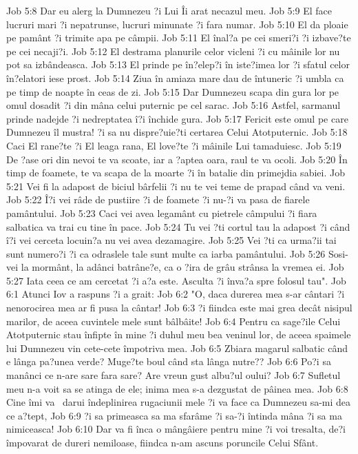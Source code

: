 Job 5:8  Dar eu alerg la Dumnezeu ?i Lui Îi arat necazul meu.
Job 5:9  El face lucruri mari ?i nepatrunse, lucruri minunate ?i fara numar.
Job 5:10  El da ploaie pe pamânt ?i trimite apa pe câmpii.
Job 5:11  El înal?a pe cei smeri?i ?i izbave?te pe cei necaji?i.
Job 5:12  El destrama planurile celor vicleni ?i cu mâinile lor nu pot sa izbândeasca.
Job 5:13  El prinde pe în?elep?i în iste?imea lor ?i sfatul celor în?elatori iese prost.
Job 5:14  Ziua în amiaza mare dau de întuneric ?i umbla ca pe timp de noapte în ceas de zi.
Job 5:15  Dar Dumnezeu scapa din gura lor pe omul dosadit ?i din mâna celui puternic pe cel sarac.
Job 5:16  Astfel, sarmanul prinde nadejde ?i nedreptatea î?i închide gura.
Job 5:17  Fericit este omul pe care Dumnezeu îl mustra! ?i sa nu dispre?uie?ti certarea Celui Atotputernic.
Job 5:18  Caci El rane?te ?i El leaga rana, El love?te ?i mâinile Lui tamaduiesc.
Job 5:19  De ?ase ori din nevoi te va scoate, iar a ?aptea oara, raul te va ocoli.
Job 5:20  În timp de foamete, te va scapa de la moarte ?i în batalie din primejdia sabiei.
Job 5:21  Vei fi la adapost de biciul bârfelii ?i nu te vei teme de prapad când va veni.
Job 5:22  Î?i vei râde de pustiire ?i de foamete ?i nu-?i va pasa de fiarele pamântului.
Job 5:23  Caci vei avea legamânt cu pietrele câmpului ?i fiara salbatica va trai cu tine în pace.
Job 5:24  Tu vei ?ti cortul tau la adapost ?i când î?i vei cerceta locuin?a nu vei avea dezamagire.
Job 5:25  Vei ?ti ca urma?ii tai sunt numero?i ?i ca odraslele tale sunt multe ca iarba pamântului.
Job 5:26  Sosi-vei la mormânt, la adânci batrâne?e, ca o ?ira de grâu strânsa la vremea ei.
Job 5:27  Iata ceea ce am cercetat ?i a?a este. Asculta ?i înva?a spre folosul tau".
Job 6:1  Atunci Iov a raspuns ?i a grait:
Job 6:2  "O, daca durerea mea s-ar cântari ?i nenorocirea mea ar fi pusa la cântar!
Job 6:3  ?i fiindca este mai grea decât nisipul marilor, de aceea cuvintele mele sunt bâlbâite!
Job 6:4  Pentru ca sage?ile Celui Atotputernic stau înfipte în mine ?i duhul meu bea veninul lor, de aceea spaimele lui Dumnezeu vin cete-cete împotriva mea.
Job 6:5  Zbiara magarul salbatic când e lânga pa?unea verde? Muge?te boul când sta lânga nutre??
Job 6:6  Po?i sa manânci ce n-are sare fara sare? Are vreun gust albu?ul oului?
Job 6:7  Sufletul meu n-a voit sa se atinga de ele; inima mea s-a dezgustat de pâinea mea.
Job 6:8  Cine îmi va  darui îndeplinirea rugaciunii mele ?i va face ca Dumnezeu sa-mi dea ce a?tept,
Job 6:9  ?i sa primeasca sa ma sfarâme ?i sa-?i întinda mâna ?i sa ma nimiceasca!
Job 6:10  Dar va fi înca o mângâiere pentru mine ?i voi tresalta, de?i împovarat de dureri nemiloase, fiindca n-am ascuns poruncile Celui Sfânt.
